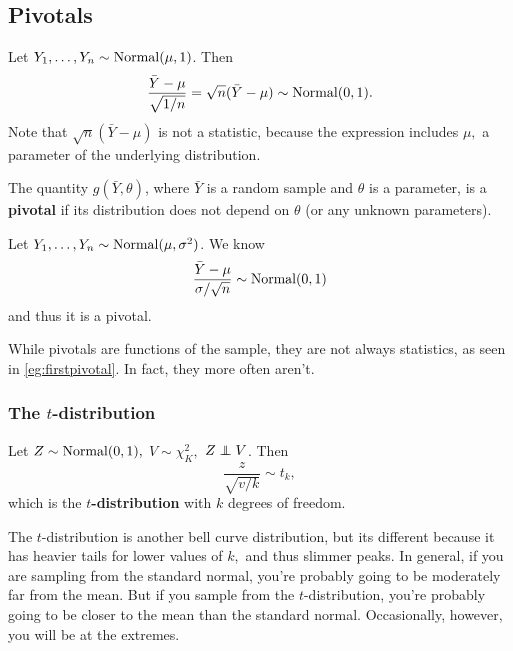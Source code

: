 \subsection{Pivotals}

\begin{eg}
\label{eg:firstpivotal}
Let $Y_1,\ldots,Y_n\sim \operatorname*{Normal}(\mu,1)$. Then 
$$
\frac{\bar Y-\mu}{\sqrt{1/n}}=\sqrt n(\bar Y-\mu)\sim \operatorname*{Normal}(0,1).
$$
Note that $\sqrt n(\bar Y-\mu)$ is not a statistic, because the expression includes $\mu,$ a parameter of the underlying distribution.
\end{eg}

\begin{definition}
		The quantity $g({\bar Y},{\theta})$, where $\bar Y$ is a random sample and $\theta$ is a parameter, is a \textbf{pivotal} if its distribution does not depend on $\theta$ (or any unknown parameters).
\end{definition} 

\begin{eg}
Let $Y_1,\ldots, Y_n\sim \operatorname*{Normal}(\mu,\sigma^2)$. We know
$$
\frac{\bar Y-\mu}{\sigma/\sqrt n}\sim \operatorname*{Normal}(0,1)
$$
and thus it is a pivotal.
\end{eg}
\begin{remark}
		While pivotals are functions of the sample, they are not always statistics, as seen in \autoref{eg:firstpivotal}. In fact, they more often aren't.
\end{remark}

\subsubsection{The $t$-distribution}
\begin{definition}
Let $Z\sim \operatorname*{Normal}(0,1),$ $V\sim \chi^2_K,$ $Z\ind V$. Then
$$
\frac{z}{\sqrt{v/k}}\sim t_k,
$$
which is the \textbf{$t$-distribution} with $k$ degrees of freedom.
\end{definition}


The $t$-distribution is another bell curve distribution, but its different because it has heavier tails for lower values of $k,$ and thus slimmer peaks. In general, if you are sampling from the standard normal, you're probably going to be moderately far from the mean. But if you sample from the $t$-distribution, you're probably going to be closer to the mean than the standard normal. Occasionally, however, you will be at the extremes.

